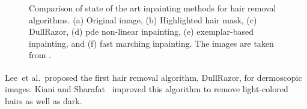 \begin{figure}
\hspace*{\fill}
\hfill
{}\hfill
{}
\hspace*{\fill}
\caption[Comparison of inpainting methods]{Comparison of state of the art inpainting methods for hair removal algorithms. (a) Original image, (b) Highlighted hair mask, (c) DullRazor, (d) \ac{pde} non-linear inpainting, (e) exemplar-based inpainting, and (f) fast marching inpainting. The images are taken from \cite{Abbas2011a}.}
\label{fig:Abas-Comparison-repair}
\end{figure}
Lee~et al.\,\cite{Lee1997} proposed the first hair removal algorithm, DullRazor\textsuperscript{\textregistered}, for dermoscopic images. 
Kiani and Sharafat~\cite{Kiani2011} improved this algorithm to remove light-colored hairs as well as dark. 

